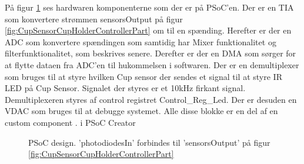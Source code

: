 \documentclass[HardwareDesign/HardwareDesign_main.tex]{subfiles}
\begin{document}
På figur \ref{fig:CupSensorPSoCDesign} ses hardwaren komponenterne som der er på PSoC'en. Der er en TIA som konvertere strømmen sensorsOutput på figur \ref{fig:CupSensorCupHolderControllerPart} om til en spænding. Herefter er der en ADC som konvertere spændingen som samtidig har Mixer funktionalitet og filterfunktionalitet, som beskrives senere. Derefter er der en DMA som sørger for at flytte dataen fra ADC'en til hukommelsen i softwaren. Der er en demultiplexer som bruges til at styre hvilken Cup sensor der sendes et signal til at styre IR LED på Cup Sensor. Signalet der styres er et 10kHz firkant signal. Demultiplexeren styres af control registret Control\_Reg\_Led. Der er desuden en VDAC som bruges til at debugge systemet. Alle disse blokke er en del af en custom component \autocite{PSoCHowToCreateCustomComponents}.  i PSoC Creator 
\begin{figure}[H]
    \centering
    \caption{PSoC design. 'photodiodesIn' forbindes til 'sensorsOutput' på figur \ref{fig:CupSensorCupHolderControllerPart}}
    \label{fig:CupSensorPSoCDesign}
\end{figure}
\end{document}
